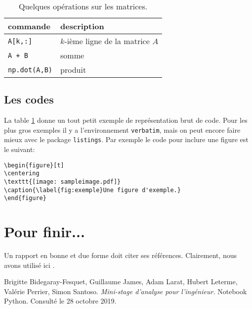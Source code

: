\documentclass[12pt]{book}
\begin{document}
\begin{table}[t]
\centering
\begin{tabular}{l|l}
\textbf{commande} & \textbf{description} \\
\hline
\verb!A[k,:]! & $k$-ième ligne de la matrice $A$ \\
\verb!A + B! & somme \\
\verb!np.dot(A,B)! & produit \\
\end{tabular}
\caption{\label{tab:operations}Quelques opérations sur les matrices.}
\end{table}

\subsection{Les codes}

La table \ref{tab:operations} donne un tout petit exemple de représentation brut de code.
Pour les plus gros exemples il y a l'environnement \verb!verbatim!, mais on peut encore faire mieux avec le package \verb!listings!.
Par exemple le code pour inclure une figure est le suivant:

\begin{lstlisting}
\begin{figure}[t]
\centering
\texttt{[image: sampleimage.pdf]}
\caption{\label{fig:exemple}Une figure d'exemple.}
\end{figure}
\end{lstlisting}

\section{Pour finir...}

Un rapport en bonne et due forme doit citer ses références. Clairement, nous avons utilisé ici \cite{ref1}.

\begin{thebibliography}{9}
 Brigitte Bidegaray-Fesquet, Guillaume James, Adam Larat, Hubert Leterme, Valérie Perrier, Simon Santoso. \textit{Mini-stage d'analyse pour l'ingénieur.}
Notebook Python. Consulté le 28 octobre 2019.
\end{thebibliography}
\end{document}
